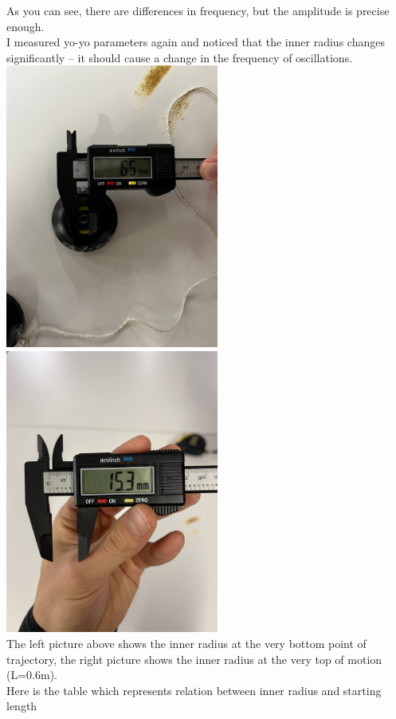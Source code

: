 \documentclass[a4paper,11pt,oneside,article]{memoir}
\begin{document}
As you can see, there are differences in frequency, but the amplitude is precise enough. \\
I measured yo-yo parameters again and noticed that the inner radius changes significantly – it should cause a change in the frequency of oscillations. \\
\includegraphics[width=7cm]{images/pic5.jpeg}
\includegraphics[width=7cm]{images/pic6.jpeg}\\
The left picture above shows the inner radius at the very bottom point of trajectory, the right picture shows the inner radius at the very top of motion (L=0.6m). \\
Here is the table which represents relation between inner radius and starting length 
\end{document}
